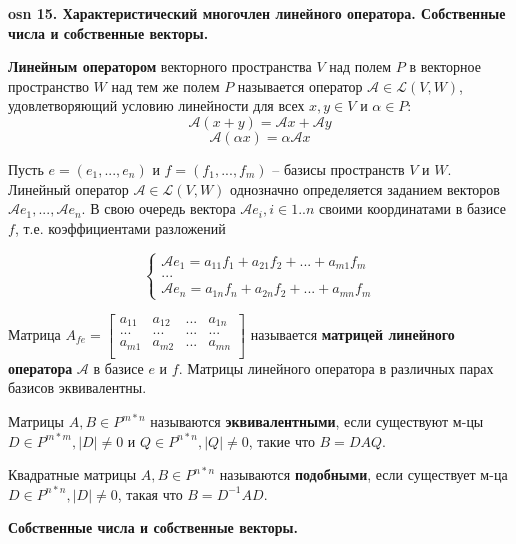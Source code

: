 \textbf{\LARGE osn 15. Характеристический многочлен линейного оператора. Собственные числа и собственные векторы.}

\textbf{Линейным оператором} векторного пространства $V$ над полем $P$ в векторное пространство $W$ над тем же полем $P$ называется оператор $\mathcal{A} \in \mathcal{L}(V, W)$, удовлетворяющий условию линейности для всех $x, y \in V$ и $\alpha \in P$:
$$\mathcal{A} (x+y) = \mathcal{A} x + \mathcal{A} y$$
$$\mathcal{A} (\alpha x) = \alpha \mathcal{A} x$$

Пусть $e = (e_1, ..., e_n)$ и $f = (f_1, ..., f_m)$ -- базисы пространств $V$ и $W$. Линейный оператор $\mathcal{A} \in \mathcal{L}(V, W)$ однозначно определяется заданием векторов $\mathcal{A} e_1, ..., \mathcal{A} e_n$. В свою очередь вектора $\mathcal{A} e_i, i \in 1..n$ своими координатами в базисе $f$, т.е. коэффициентами разложений

$$\begin{cases} 
 \mathcal{A} e_1 = a_{11} f_1 + a_{21} f_2 + ... + a_{m1} f_m \\
 ... \\
 \mathcal{A} e_n = a_{1n} f_n + a_{2n} f_2 + ... + a_{mn} f_m
\end{cases}$$

Матрица $A_{fe} = 
\begin{bmatrix}
a_{11} & a_{12} & ... & a_{1n} \\
... & ... & ... & ... \\
a_{m1} & a_{m2} & ... & a_{mn} \\
\end{bmatrix}$
называется \textbf{матрицей линейного оператора} $\mathcal{A}$ в базисе $e$ и $f$. Матрицы линейного оператора в различных парах базисов эквивалентны.

Матрицы $A, B \in P^{m*n}$ называются \textbf{эквивалентными}, если существуют м-цы $D \in P^{m*m}, |D| \neq 0$ и $Q \in P^{n*n}, |Q| \neq 0$, такие что $B = D A Q$.

Квадратные матрицы $A, B \in P^{n*n}$ называются \textbf{подобными}, если существует м-ца $D \in P^{n*n}, |D| \neq 0$, такая что $B = D^{-1} A D$.


\centerline{\textbf{Собственные числа и собственные векторы.}}

